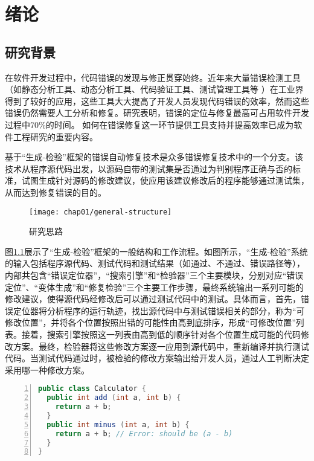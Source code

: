 \chapter{绪论}
\label{cha:intro}

\section{研究背景}%
在软件开发过程中，代码错误的发现与修正贯穿始终。近年来大量错误检测工具（如静态分析工具、动态分析工具、代码验证工具、测试管理工具等%
）在工业界得到了较好的应用，这些工具大大提高了开发人员发现代码错误的效率，然而这些错误仍然需要人工分析和修复。研究表明，错误的定位与修复最高可占用软件开发过程中70\%的时间。%
如何在错误修复这一环节提供工具支持并提高效率已成为软件工程研究的重要内容。

基于“生成-检验”框架的错误自动修复技术是众多错误修复技术中的一个分支。该技术从程序源代码出发，以源码自带的测试集是否通过为判别程序正确与否的标准，试图生成针对源码的修改建议，使应用该建议修改后的程序能够通过测试集，从而达到修复错误的目的。
\begin{figure}[!h]
	\centering
	\texttt{[image: chap01/general-structure]}
	\caption{研究思路}
	\label{fig:general-structure}
\end{figure}

图\ref{fig:general-structure}展示了“生成-检验”框架的一般结构和工作流程。如图所示，“生成-检验”系统的输入包括程序源代码、测试代码和测试结果（如通过、不通过、错误路径等），内部共包含“错误定位器”，“搜索引擎”和“检验器”三个主要模块，分别对应“错误定位”、“变体生成”和“修复检验”三个主要工作步骤，最终系统输出一系列可能的修改建议，使得源代码经修改后可以通过测试代码中的测试。具体而言，首先，错误定位器将分析程序的运行轨迹，找出源代码中与测试错误相关的部分，称为“可修改位置”，并将各个位置按照出错的可能性由高到底排序，形成“可修改位置”列表。接着，搜索引擎按照这一列表由高到低的顺序针对各个位置生成可能的代码修改方案。最终，检验器将这些修改方案逐一应用到源代码中，重新编译并执行测试代码。当测试代码通过时，被检验的修改方案输出给开发人员，通过人工判断决定采用哪一种修改方案。

\begin{lstlisting}[caption=“生成-检验”框架应用示例,frame=single,language=Java,numbers=left,basicstyle=\ttfamily\footnotesize,label=code:example-src]
public class Calculator {
  public int add (int a, int b) {
    return a + b;
  }
  public int minus (int a, int b) {
    return a + b; // Error: should be (a - b)
  }
}
\end{lstlisting}

